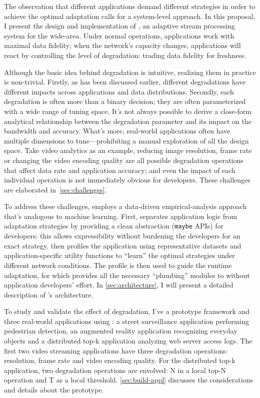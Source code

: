 The observation that different applications demand different strategies in order
to achieve the optimal adaptation calls for a system-level approach. In this
proposal, I present the design and implementation of \sysname{}, an adaptive
stream processing system for the wide-area. Under normal operations, \sysname{}
applications work with maximal data fidelity; when the network's capacity
changes, applications will react by controlling the level of degradation:
trading data fidelity for freshness.

Although the basic idea behind degradation is intuitive, realizing them in
practice is non-trivial. Firstly, as has been discussed earlier, different
degradations have different impacts across applications and data
distributions. Secondly, each degradation is often more than a binary decision;
they are often parameterized with a wide range of tuning space. It's not always
possible to derive a close-form analytical relationship between the degradation
parameter and its impact on the bandwidth and accuracy. What's more, real-world
applications often have multiple dimensions to tune---prohibiting a manual
exploration of all the design space. Take video analytics as an example,
reducing image resolution, frame rate or changing the video encoding quality are
all possible degradation operations that affect data rate and application
accuracy; and even the impact of each individual operation is not immediately
obvious for developers. These challenges are elaborated
in~\autoref{sec:challenges}.

To address these challenges, \sysname{} employs a data-driven empirical-analysis
approach that's analogous to machine learning.  First, \sysname{} separates
application logic from adaptation strategies by providing a clean abstraction
(\texttt{maybe} APIs) for developers: this allows expressibility without
burdening the developers for an exact strategy. \sysname{} then profiles the
application using representative datasets and application-specific utility
functions to ``learn'' the optimal strategies under different network
conditions. The profile is then used to guide the runtime adaptation, for which
\sysname{} provides all the necessary ``plumbing'' modules to without
application developers' effort. In \autoref{sec:architecture}, I will present a
detailed description of \sysname{}'s architecture.

To study and validate the effect of degradation, I've a prototype framework and
three real-world applications using \sysname{}: a street surveillance
application performing pedestrian detection, an augmented reality application
recognizing everyday objects and a distributed top-k application analyzing web
server access logs. The first two video streaming applications have three
degradation operations: resolution, frame rate and video encoding quality. For
the distributed top-k application, two degradation operations are envolved: N in
a local top-N operation and T as a local threshold. \autoref{sec:build-appl}
discusses the considerations and details about the prototype.

